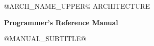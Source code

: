 \begin{titlepage}
\centering
\vspace*{0.75in}
{\Large @ARCH_NAME_UPPER@ ARCHITECTURE\par}
\vspace{0.25in}
{\Huge\bfseries Programmer's Reference Manual\par}
\vspace{0.35in}
{\large @MANUAL_SUBTITLE@\par}
\vfill
\end{titlepage}
\tableofcontents
\clearpage
\listoftables
\clearpage
\listoffigures
\clearpage
{}
